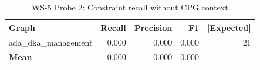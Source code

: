 \begin{table}[htbp]
\centering
\caption{WS-5 Probe 2: Constraint recall without CPG context}
\label{tab:ws5-constraint-recall}
\begin{tabular}{lrrrr}
\toprule
Graph & Recall & Precision & F1 & |Expected| \\
\midrule
ada\_dka\_management & 0.000 & 0.000 & 0.000 & 21 \\
\textbf{Mean} & 0.000 & 0.000 & 0.000 &  \\
\bottomrule
\end{tabular}
\end{table}
